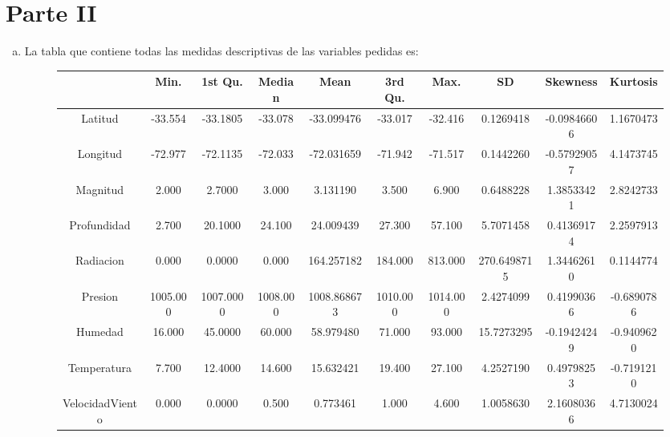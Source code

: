 \documentclass{article}
\begin{document}
\section*{Parte II}
\begin{enumerate}[a)]
\item La tabla que contiene todas las medidas descriptivas de las variables pedidas es:\\
\begin{figure}[h!]
\begin{adjustwidth}{-2cm}{}
\begin{tabular}{|c|c|c|c|c|c|c|c|c|c|}
\hline
                    &Min.&   1st Qu.&   Median       & Mean&  3rd Qu.&     Max.&          SD   & Skewness&   Kurtosis\\
\hline
Latitud       &   -33.554&  -33.1805&  -33.078 & -33.099476&  -33.017 & -32.416&   0.1269418& -0.09846606 & 1.1670473\\
\hline
Longitud  &       -72.977 & -72.1135&  -72.033 & -72.031659&  -71.942 & -71.517&   0.1442260& -0.57929057&  4.1473745\\
\hline
Magnitud &          2.000  &  2.7000&    3.000   & 3.131190&    3.500&    6.900&   0.6488228 & 1.38533421&  2.8242733\\
\hline
Profundidad    &    2.700 &  20.1000&   24.100  & 24.009439 &  27.300 &  57.100 &  5.7071458 & 0.41369174 & 2.2597913\\
\hline
Radiacion  &        0.000   & 0.0000 &   0.000 & 164.257182 & 184.000 & 813.000& 270.6498715 & 1.34462610 & 0.1144774\\
\hline
Presion  &       1005.000& 1007.0000& 1008.000& 1008.868673& 1010.000 &1014.000  & 2.4274099 & 0.41990366& -0.6890786\\
\hline
Humedad   &        16.000  & 45.0000 &  60.000  & 58.979480&   71.000 &  93.000 & 15.7273295& -0.19424249& -0.9409620\\
\hline
Temperatura   &     7.700  & 12.4000 &  14.600  & 15.632421 &  19.400 &  27.100 &  4.2527190 & 0.49798253& -0.7191210\\
\hline
VelocidadViento  &  0.000 &   0.0000 &   0.500   & 0.773461 &   1.000  &  4.600 &  1.0058630 & 2.16080366 & 4.7130024\\
\hline
\end{tabular}
\end{adjustwidth}
\end{figure}


\end{enumerate}
\end{document}
